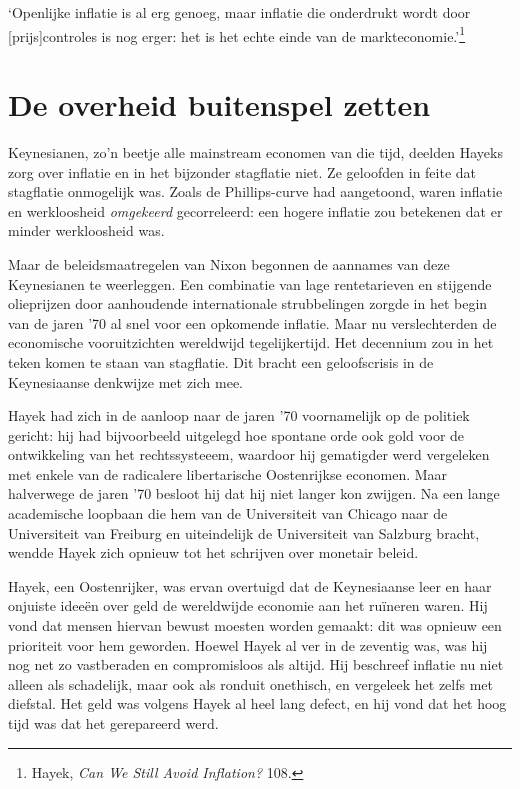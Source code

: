 \documentclass[
  a5paper,
  smalldemyvopaper,11pt,twoside,onecolumn,openright,extrafontsizes,
hidelinks]{memoir}
\renewenvironment{quote}%
               {\list{}{\rightmargin=.3cm\leftmargin=.3cm}%
                \itshape \item[]}%
               {\endlist}
\begin{document}
\begin{quote}
`Openlijke inflatie is al erg genoeg, maar inflatie die onderdrukt wordt
door {[}prijs{]}controles is nog erger: het is het echte einde van de
markteconomie.'\footnote{\hspace{0pt}Hayek, \emph{Can We Still Avoid
  Inflation?} 108.}
\end{quote}

\section{De overheid buitenspel
zetten}\label{de-overheid-buitenspel-zetten}

Keynesianen, zo'n beetje alle mainstream economen van die tijd, deelden
Hayeks zorg over inflatie en in het bijzonder stagflatie niet. Ze
geloofden in feite dat stagflatie onmogelijk was. Zoals de
Phillips-curve had aangetoond, waren inflatie en werkloosheid
\emph{omgekeerd} gecorreleerd: een hogere inflatie zou betekenen dat er
minder werkloosheid was.

Maar de beleidsmaatregelen van Nixon begonnen de aannames van deze
Keynesianen te weerleggen. Een combinatie van lage rentetarieven en
stijgende olieprijzen door aanhoudende internationale strubbelingen
zorgde in het begin van de jaren '70 al snel voor een opkomende
inflatie. Maar nu verslechterden de economische vooruitzichten
wereldwijd tegelijkertijd. Het decennium zou in het teken komen te staan
van stagflatie. Dit bracht een geloofscrisis in de Keynesiaanse
denkwijze met zich mee.

Hayek had zich in de aanloop naar de jaren '70 voornamelijk op de
politiek gericht: hij had bijvoorbeeld uitgelegd hoe spontane orde ook
gold voor de ontwikkeling van het rechtssysteeem, waardoor hij
gematigder werd vergeleken met enkele van de radicalere libertarische
Oostenrijkse economen. Maar halverwege de jaren '70 besloot hij dat hij
niet langer kon zwijgen. Na een lange academische loopbaan die hem van
de Universiteit van Chicago naar de Universiteit van Freiburg en
uiteindelijk de Universiteit van Salzburg bracht, wendde Hayek zich
opnieuw tot het schrijven over monetair beleid.

Hayek, een Oostenrijker, was ervan overtuigd dat de Keynesiaanse leer en
haar onjuiste ideeën over geld de wereldwijde economie aan het ruïneren
waren. Hij vond dat mensen hiervan bewust moesten worden gemaakt: dit
was opnieuw een prioriteit voor hem geworden. Hoewel Hayek al ver in de
zeventig was, was hij nog net zo vastberaden en compromisloos als
altijd. Hij beschreef inflatie nu niet alleen als schadelijk, maar ook
als ronduit onethisch, en vergeleek het zelfs met diefstal. Het geld was
volgens Hayek al heel lang defect, en hij vond dat het hoog tijd was dat
het gerepareerd werd.
\end{document}
